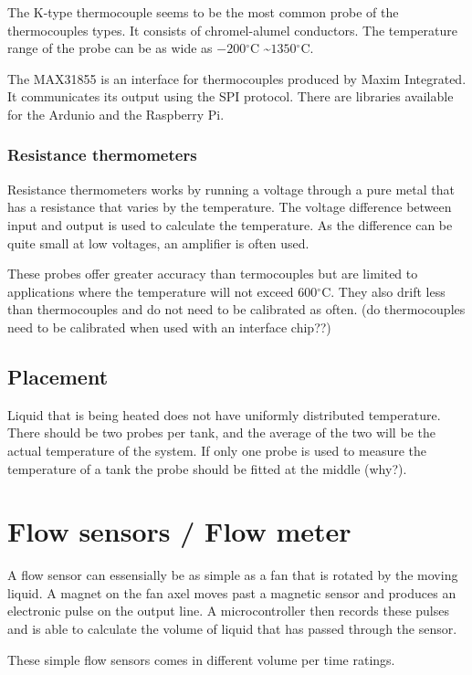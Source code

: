 \documentclass[11pt,fleqn,openany]{book} %
\newcommand{\degree}{\ensuremath{^\circ}}
\begin{document}
The K-type thermocouple seems to be the most common probe of the thermocouples types. It consists of chromel-alumel conductors. The temperature range of the probe can be as wide as $-200\degree$C \textasciitilde $1350\degree$C.

The MAX31855 is an interface for thermocouples produced by Maxim Integrated. It communicates its output using the SPI protocol. There are libraries available for the Ardunio and the Raspberry Pi. 

\subsubsection{Resistance thermometers}

Resistance thermometers works by running a voltage through a pure metal that has a resistance that varies by the temperature. The voltage difference between input and output is used to calculate the temperature. As the difference can be quite small at low voltages, an amplifier is often used.

These probes offer greater accuracy than termocouples but are limited to applications where the temperature will not exceed $600\degree$C. They also drift less than thermocouples and do not need to be calibrated as often. (do thermocouples need to be calibrated when used with an interface chip??)

\subsection{Placement}

Liquid that is being heated does not have uniformly distributed temperature. There should be two probes per tank, and the average of the two will be the actual temperature of the system.
If only one probe is used to measure the temperature of a tank the probe should be fitted at the middle (why?).

\section{Flow sensors / Flow meter}

A flow sensor can essensially be as simple as a fan that is rotated by the moving liquid. A magnet on the fan axel moves past a magnetic sensor and produces an electronic pulse on the output line. A microcontroller then records these pulses and is able to calculate the volume of liquid that has passed through the sensor.

These simple flow sensors comes in different volume per time ratings. 
\end{document}
